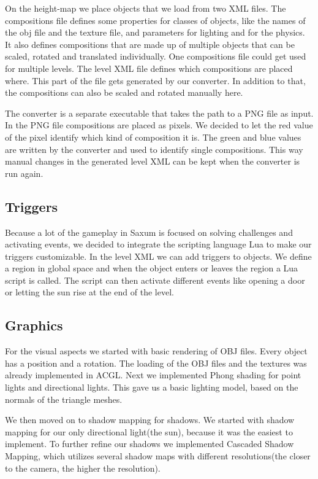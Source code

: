 \documentclass[sponsored]{acmsiggraph}
\begin{document}
On the height-map we place objects that we load from two XML files. The compositions file defines some properties for classes of objects, like the names of the obj file and the texture file, and parameters for lighting and for the physics. It also defines compositions that are made up of multiple objects that can be scaled, rotated and translated individually. One compositions file could get used for multiple levels. The level XML file defines which compositions are placed where. This part of the file gets generated by our converter. In addition to that, the compositions can also be scaled and rotated manually here.

The converter is a separate executable that takes the path to a PNG file as input. In the PNG file compositions are placed as pixels.
We decided to let the red value of the pixel identify which kind of composition it is. The green and blue values are written by the converter and used to identify single compositions. This way manual changes in the generated level XML can be kept when the converter is run again.

\subsection{Triggers}

Because a lot of the gameplay in Saxum is focused on solving challenges and activating events, we decided to integrate the scripting language Lua to make our triggers customizable. In the level XML we can add triggers to objects. We define a region in global space and when the object enters or leaves the region a Lua script is called. The script can then activate different events like opening a door or letting the sun rise at the end of the level.

\subsection{Graphics}

For the visual aspects we started with basic rendering of OBJ files. Every object has a position and a rotation.
The loading of the OBJ files and the textures was already implemented in ACGL.
Next we implemented Phong shading for point lights and directional lights.
This gave us a basic lighting model, based on the normals of the triangle meshes.

We then moved on to shadow mapping for shadows.
We started with shadow mapping for our only directional light(the sun), because it was the easiest to implement.
To further refine our shadows we implemented Cascaded Shadow Mapping, which utilizes several shadow maps with different
resolutions(the closer to the camera, the higher the resolution).
\end{document}
